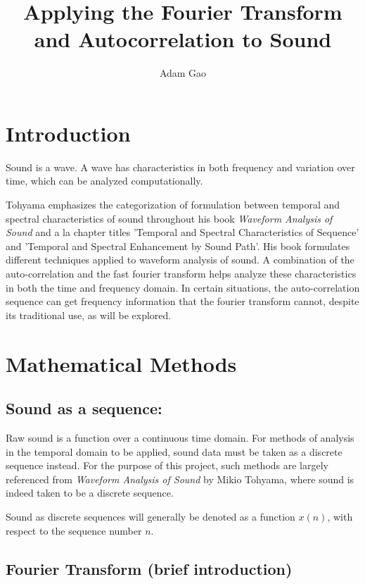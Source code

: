 \documentclass[12pt]{article}
\title{Applying the Fourier Transform and Autocorrelation to Sound}
\author{Adam Gao}
\begin{document}
\maketitle

\section{Introduction}

Sound is a wave. A wave has characteristics in both frequency and variation over time, which can be analyzed computationally.\newline

Tohyama emphasizes the categorization of formulation between temporal and spectral characteristics of sound throughout his book \textit{Waveform Analysis of Sound} and a la chapter titles 'Temporal and Spectral Characteristics of Sequence' and 'Temporal and Spectral Enhancement by Sound Path'.\citep{aa} His book formulates different techniques applied to waveform analysis of sound. A combination of the auto-correlation and the fast fourier transform helps analyze these characteristics in both the time and frequency domain. In certain situations, the auto-correlation sequence can get frequency information that the fourier transform cannot, despite its traditional use, as will be explored.

\section{Mathematical Methods}

\subsection{Sound as a sequence:}

Raw sound is a function over a continuous time domain. For methods of analysis in the temporal domain to be applied, sound data must be taken as a discrete sequence instead.\citep{aa} For the purpose of this project, such methods are largely referenced from \textit{Waveform Analysis of Sound} by Mikio Tohyama, where sound is indeed taken to be a discrete sequence.\citep{aa} \newline

Sound as discrete sequences will generally be denoted as a function $x(n)$, with respect to the sequence number $n$.

\subsection{Fourier Transform (brief introduction)}
\end{document}
